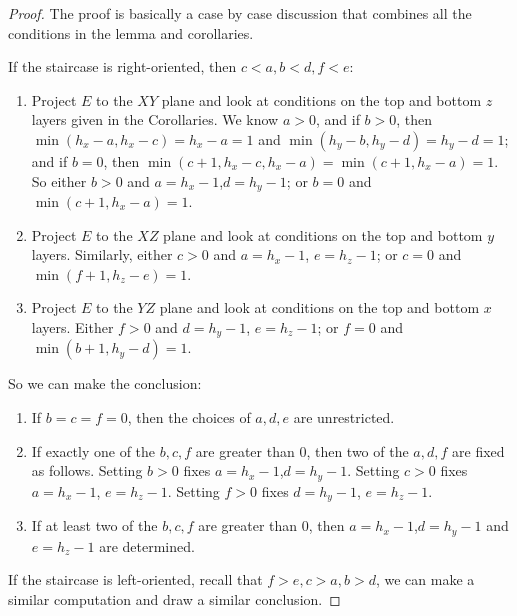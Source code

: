 \documentclass{amsart}[10pt]
\theoremstyle{plain}
\theoremstyle{definition}
\begin{document}
\begin{proof}
The proof is basically a case by case discussion that combines all the conditions in the lemma and corollaries.

If the staircase is right-oriented, then $c<a, b<d, f<e$:
 
\begin{enumerate}
\item Project $E$ to the $XY$ plane and look at conditions on the top and bottom $z$ layers given in the Corollaries. 
We know $a>0$, and if $b>0$, then $\min(h_x-a, h_x-c)=h_x-a=1$ and $\min(h_y-b, h_y-d)=h_y-d=1$; and if $b=0$, then $\min(c+1, h_x-c, h_x-a)=\min(c+1, h_x-a)=1$.
So either $b>0$ and $a=h_x-1$,$d=h_y-1$; or $b=0$ and $\min(c+1, h_x-a)=1$.

\item Project $E$ to the $XZ$ plane and look at conditions on the top and bottom $y$ layers. Similarly, either $c>0$ and $a=h_x-1$, $e=h_z-1$; or $c=0$ and $\min(f+1, h_z-e)=1$.

\item Project $E$ to the $YZ$ plane and look at conditions on the top and bottom $x$ layers. Either $f>0$ and $d=h_y-1$, $e=h_z-1$; or $f=0$ and $\min(b+1, h_y-d)=1$.

\end{enumerate}

So we can make the conclusion:

\begin{enumerate}
\item If $b=c=f=0$, then the choices of $a,d,e$ are unrestricted.

\item If exactly one of the $b,c,f$ are greater than $0$, then two of the $a,d,f$ are fixed as follows. Setting $b>0$ fixes $a=h_x-1$,$d=h_y-1$. Setting $c>0$ fixes $a=h_x-1$, $e=h_z-1$. Setting $f>0$ fixes $d=h_y-1$, $e=h_z-1$.

\item If at least two of the $b, c, f$ are greater than $0$, then $a=h_x-1$,$d=h_y-1$ and $e=h_z-1$ are determined.

\end{enumerate}


If the staircase is left-oriented, recall that $f>e, c>a, b>d$, we can make a similar computation and draw a similar conclusion.

 
\end{proof}
\end{document}
